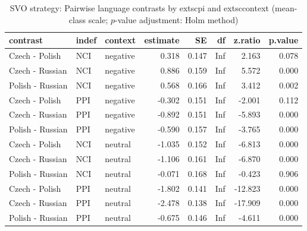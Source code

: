 \begin{table}[!h]
\centering
\caption{SVO strategy: Pairwise language contrasts by 	extsc{pi} and 	extsc{context} (mean-class scale; $p$-value adjustment: Holm method)}
\centering
\begin{tabular}[t]{lllrrrrr}
\toprule
contrast & indef & context & estimate & SE & df & z.ratio & p.value\\
\midrule
Czech - Polish & NCI & negative & 0.318 & 0.147 & Inf & 2.163 & 0.078\\
Czech - Russian & NCI & negative & 0.886 & 0.159 & Inf & 5.572 & 0.000\\
Polish - Russian & NCI & negative & 0.568 & 0.166 & Inf & 3.412 & 0.002\\
Czech - Polish & PPI & negative & -0.302 & 0.151 & Inf & -2.001 & 0.112\\
Czech - Russian & PPI & negative & -0.892 & 0.151 & Inf & -5.893 & 0.000\\
\addlinespace
Polish - Russian & PPI & negative & -0.590 & 0.157 & Inf & -3.765 & 0.000\\
Czech - Polish & NCI & neutral & -1.035 & 0.152 & Inf & -6.813 & 0.000\\
Czech - Russian & NCI & neutral & -1.106 & 0.161 & Inf & -6.870 & 0.000\\
Polish - Russian & NCI & neutral & -0.071 & 0.168 & Inf & -0.423 & 0.906\\
Czech - Polish & PPI & neutral & -1.802 & 0.141 & Inf & -12.823 & 0.000\\
\addlinespace
Czech - Russian & PPI & neutral & -2.478 & 0.138 & Inf & -17.909 & 0.000\\
Polish - Russian & PPI & neutral & -0.675 & 0.146 & Inf & -4.611 & 0.000\\
\bottomrule
\end{tabular}
\end{table}
